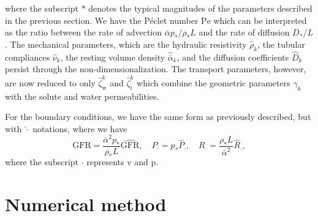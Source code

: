 \documentclass{article}
\begin{document}
    where the subscript $*$ denotes the typical magnitudes of the parameters described in the previous section.
We have the P\'eclet number $\mathrm{Pe}$ which can be interpreted as the ratio between the rate of advection $\bar{\alpha}p_*/\rho_*L$ and the rate of diffusion $D_*/L$.
The mechanical parameters, which are the hydraulic resistivity $\hat{\rho}_k$, the tubular compliances $\hat{\nu}_k$, the resting volume density $\hat{\bar{\alpha}}_k$, and the diffusion coefficients $\hat{D}_k$ persist through the non-dimensionalization.
The transport parameters, however, are now reduced to only $\hat{\zeta}_\mathrm{w}^k$ and $\hat{\zeta}_i^k$ which combine the geometric parameters $\gamma_k$ with the solute and water permeabilities.

For the boundary conditions, we have the same form as previously described, but with $\hat{\cdot}$ notations, where we have
\begin{equation}
    \mathrm{GFR} = \frac{\bar{\alpha}^2 p_*}{\rho_* L}\widehat{\mathrm{GFR}},\quad
    P_\cdot = p_*\hat{P}_\cdot,\quad R_\cdot = \frac{\rho_* L}{\bar{\alpha}^2}\hat{R}_\cdot,
\end{equation}
    where the subscript $\cdot$ represents $\mathrm{v}$ and $\mathrm{p}$.

\section{Numerical method}
\end{document}
